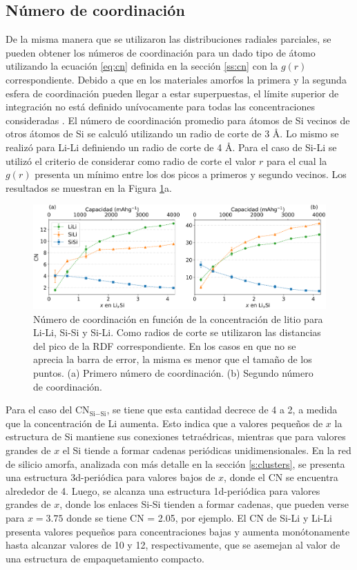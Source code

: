 \subsection{Número de coordinación}

De la misma manera que se utilizaron las distribuciones radiales parciales, se pueden
obtener los números de coordinación para un dado tipo de átomo utilizando la ecuación
\ref{eq:cn} definida en la sección \ref{ss:cn} con la $g(r)$ correspondiente. Debido
a que en los materiales amorfos la primera y la segunda esfera de coordinación pueden 
llegar a estar superpuestas, el límite superior de integración no está definido 
unívocamente para todas las concentraciones consideradas \cite{lamparter1995}.
El número de coordinación promedio para átomos de Si vecinos de otros átomos 
de Si se calculó utilizando un radio de 
corte de 3 \AA. Lo mismo se realizó para Li-Li definiendo un radio de corte de 
4 \AA. Para el caso de Si-Li se utilizó el criterio de considerar como radio de 
corte el valor $r$ para el cual la $g(r)$ presenta un mínimo entre los dos picos
a primeros y segundo vecinos. Los resultados se muestran en la Figura 
\ref{fig:cn}a.
\begin{figure}[h!]
    \centering
    \includegraphics[width=\textwidth]{Silicio/caracterizacion/resultados/cn/cn.png}
    \caption{Número de coordinación en función de la concentración de litio para
    Li-Li, Si-Si y Si-Li. Como radios de corte se utilizaron las distancias 
    del pico de la RDF correspondiente. En los casos en que no se aprecia la barra
    de error, la misma es menor que el tamaño de los puntos. (a) Primero número 
    de coordinación. (b) Segundo número de coordinación.}
    \label{fig:cn}
\end{figure}

Para el caso del CN$_{\text{Si}-\text{Si}}$, se tiene que esta cantidad decrece de 4 a 2, a 
medida que la concentración de Li aumenta. Esto indica que a valores pequeños de 
$x$ la estructura de Si mantiene sus conexiones tetraédricas, mientras que para
valores grandes de $x$ el Si tiende a formar cadenas periódicas unidimensionales.
En la red de silicio amorfa, analizada con más detalle en la sección 
\ref{s:clusters}, se presenta una estructura 3d-periódica para valores bajos de 
$x$, donde el CN se encuentra alrededor de 4. Luego, se alcanza una estructura 1d-periódica 
para valores grandes de $x$, donde los enlaces Si-Si tienden a formar 
cadenas, que pueden verse para $x = 3.75$ donde se tiene CN = 2.05, por ejemplo.
El CN de Si-Li y Li-Li presenta valores pequeños para concentraciones 
bajas y aumenta monótonamente hasta alcanzar valores de 10 y 12, respectivamente, 
que se asemejan al valor de una estructura de empaquetamiento compacto.

